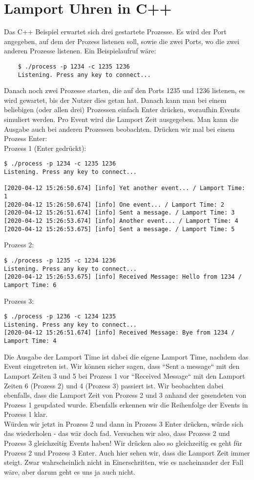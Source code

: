 \documentclass[a4paper,11pt]{report}
\begin{document}
\section{Lamport Uhren in C++}
Das C++ Beispiel erwartet sich drei gestartete Prozesse. Es wird der Port angegeben, auf dem der Prozess listenen soll, sowie die zwei Ports, wo die zwei anderen Prozesse listenen. Ein Beispielaufruf wäre:
\begin{verbatim}
    $ ./process -p 1234 -c 1235 1236
    Listening. Press any key to connect...
\end{verbatim}
Danach noch zwei Prozesse starten, die auf den Ports 1235 und 1236 listenen, es wird gewartet, bis der Nutzer dies getan hat. Danach kann man bei einem beliebigen (oder allen drei) Prozessen einfach Enter drücken, woraufhin Events simuliert werden. Pro Event wird die Lamport Zeit ausgegeben. Man kann die Ausgabe auch bei anderen Prozessen beobachten. Drücken wir mal bei einem Prozess Enter:\\
Prozess 1 (Enter gedrückt):
\begin{verbatim}
$ ./process -p 1234 -c 1235 1236
Listening. Press any key to connect...

[2020-04-12 15:26:50.674] [info] Yet another event... / Lamport Time: 1
[2020-04-12 15:26:50.674] [info] One event... / Lamport Time: 2
[2020-04-12 15:26:51.674] [info] Sent a message. / Lamport Time: 3
[2020-04-12 15:26:53.674] [info] Another event... / Lamport Time: 4
[2020-04-12 15:26:53.675] [info] Sent a message. / Lamport Time: 5
\end{verbatim}
Prozess 2:
\begin{verbatim}
$ ./process -p 1235 -c 1234 1236
Listening. Press any key to connect...
[2020-04-12 15:26:53.675] [info] Received Message: Hello from 1234 / Lamport Time: 6
\end{verbatim}
Prozess 3:
\begin{verbatim}
$ ./process -p 1236 -c 1234 1235
Listening. Press any key to connect...
[2020-04-12 15:26:51.674] [info] Received Message: Bye from 1234 / Lamport Time: 4
\end{verbatim}
Die Ausgabe der Lamport Time ist dabei die eigene Lamport Time, nachdem das Event eingetreten ist. Wir können sicher sagen, dass ``Sent a message`` mit den Lamport Zeiten 3 und 5 bei Prozess 1 vor ``Received Message`` mit den Lamport Zeiten 6 (Prozess 2) und 4 (Prozess 3) passiert ist. Wir beobachten dabei ebenfalls, dass die Lamport Zeit von Prozess 2 und 3 anhand der gesendeten von Prozess 1 geupdated wurde. Ebenfalls erkennen wir die Reihenfolge der Events in Prozess 1 klar.\\
Würden wir jetzt in Prozess 2 und dann in Prozess 3 Enter drücken, würde sich das wiederholen - das wär doch fad. Versuchen wir also, dass Prozess 2 und Prozess 3 gleichzeitig Events haben! Wir drücken also so gleichzeitig es geht für Prozess 2 und Prozess 3 Enter. Auch hier sehen wir, dass die Lamport Zeit immer steigt. Zwar wahrscheinlich nicht in Einerschritten, wie es nacheinander der Fall wäre, aber darum geht es uns ja auch nicht.
\end{document}
